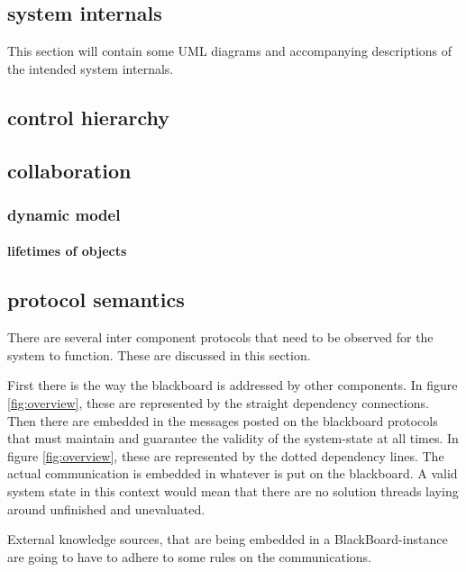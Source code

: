 \documentclass[]{lofar}
\begin{document}
    \subsection{system internals}

      This section will contain some UML diagrams and accompanying
      descriptions of the intended system internals.

      \subsection{control hierarchy}

      \subsection{collaboration}

      \subsubsection{dynamic model}

        \paragraph{lifetimes of objects}

    \subsection{protocol semantics}

      There are several inter component protocols that need to be
      observed for the system to function. These are discussed in this
      section.

      First there is the way the blackboard is addressed by other
      components. In figure
      \hyperlink{fig:overview}{\ref{fig:overview}}, these are
      represented by the straight dependency connections. Then there
      are embedded in the messages posted on the blackboard protocols
      that must maintain and guarantee the validity of the
      system-state at all times. In figure
      \hyperlink{fig:overview}{\ref{fig:overview}}, these are
      represented by the dotted dependency lines. The actual
      communication is embedded in whatever is put on the
      blackboard. A valid system state in this context would mean that
      there are no solution threads laying around unfinished and
      unevaluated.

      External knowledge sources, that are being embedded in a
      BlackBoard-instance are going to have to adhere to some rules on
      the communications.
\end{document}
